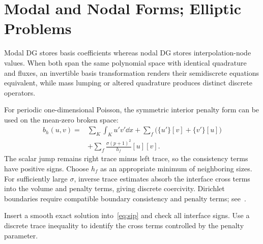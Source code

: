 \section{Modal and Nodal Forms; Elliptic Problems}
Modal DG stores basis coefficients whereas nodal DG stores interpolation-node values. When both span the same polynomial space with identical quadrature and fluxes, an invertible basis transformation renders their semidiscrete equations equivalent, while mass lumping or altered quadrature produces distinct discrete operators.

For periodic one-dimensional Poisson, the symmetric interior penalty form can be used on the mean-zero broken space:
\begin{equation}\label{eq:sip}
\begin{aligned}
b_h(u,v)={}&\sum_K\int_Ku'v'\dd x
+\sum_f\bigl(\{u'\}[v]+\{v'\}[u]\bigr)\\
&+\sum_f\frac{\sigma(p+1)^2}{h_f}[u][v].
\end{aligned}
\end{equation}
The scalar jump remains right trace minus left trace, so the consistency terms have positive signs.
Choose $h_f$ as an appropriate minimum of neighboring sizes. For sufficiently large $\sigma$,
inverse trace estimates absorb the interface cross terms into the volume and penalty terms, giving discrete coercivity.
Dirichlet boundaries require compatible boundary consistency and penalty terms; see~\cite{arnold2002}.

{Insert a smooth exact solution into~\eqref{eq:sip} and check all interface signs. Use a discrete trace inequality to identify the cross terms controlled by the penalty parameter.}
